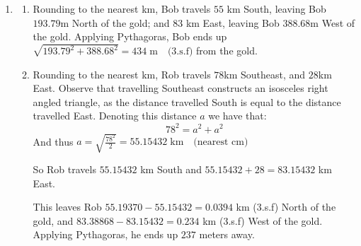\documentclass{article}
\begin{document}
\begin{enumerate}
    \item \begin{enumerate}
        \item Rounding to the nearest km, Bob travels $55$ km South, leaving Bob $193.79$m North of the gold; and $83$ km East, leaving Bob $388.68$m West of the gold. Applying Pythagoras, Bob ends up $\sqrt{193.79^2 + 388.68^2} = 434 \; \text{m} \quad \text{(3.s.f)}$ from the gold.


        
        \item Rounding to the nearest km, Rob travels $78$km Southeast, and $28$km East. Observe that travelling Southeast constructs an isosceles right angled triangle, as the distance travelled South is equal to the distance travelled East. Denoting this distance $a$ we have that: $$78^2 = a^2 + a^2$$
        And thus $a = \sqrt{\frac{78^2}{2}} = 55.15432 \; \text{km} \quad \text{(nearest cm)}$

        So Rob travels $55.15432$ km South and $55.15432 + 28 = 83.15432 $ km East.

        This leaves Rob $55.19370-55.15432=0.0394$ km  (3.s.f) North of the gold, and $83.38868 - 83.15432 = 0.234$ km (3.s.f) West of the gold. Applying Pythagoras, he ends up $237$ meters away.

\end{enumerate}
\end{enumerate}
\end{document}
